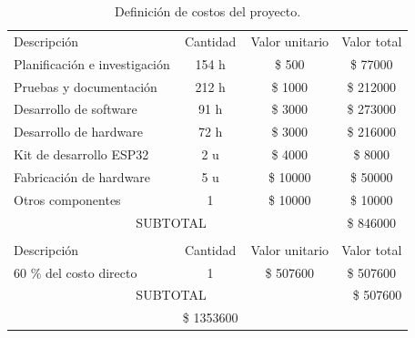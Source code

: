 \documentclass[
11pt, %
]{charter}
\begin{document}
\begin{table}[htpb]
\begin{tabularx}{\linewidth}{@{}|X|c|r|r|@{}}
\hline
\rowcolor[HTML]{C0C0C0} 
\hline
\multicolumn{4}{|c|}{\cellcolor[HTML]{C0C0C0}COSTOS DIRECTOS} \\ \hline
\rowcolor[HTML]{C0C0C0} \hline
Descripción &
  \multicolumn{1}{c|}{\cellcolor[HTML]{C0C0C0}Cantidad} &
  \multicolumn{1}{c|}{\cellcolor[HTML]{C0C0C0}Valor unitario} &
  \multicolumn{1}{c|}{\cellcolor[HTML]{C0C0C0}Valor total} \\ \hline
  
 Planificación e investigación & 
  \multicolumn{1}{c|}{154 h} & 
  \multicolumn{1}{c|}{\$ 500} &
  \multicolumn{1}{c|}{\$ 77000} \\ \hline
  
 Pruebas y documentación & 
  \multicolumn{1}{c|}{212 h} & 
  \multicolumn{1}{c|}{\$ 1000} &
  \multicolumn{1}{c|}{\$ 212000} \\ \hline
  
 Desarrollo de software & 
  \multicolumn{1}{c|}{91 h} & 
  \multicolumn{1}{c|}{\$ 3000} &
  \multicolumn{1}{c|}{\$ 273000} \\ \hline
  
 Desarrollo de hardware &
  \multicolumn{1}{c|}{72 h} &
  \multicolumn{1}{c|}{\$ 3000} &
  \multicolumn{1}{c|}{\$ 216000} \\ \hline
  
 Kit de desarrollo ESP32 &
  \multicolumn{1}{c|}{ 2 u} &
  \multicolumn{1}{c|}{ \$ 4000 } &
  \multicolumn{1}{c|}{\$ 8000} \\ \hline
  
 Fabricación de hardware &
  \multicolumn{1}{c|}{5 u} &
  \multicolumn{1}{c|}{\$ 10000} &
  \multicolumn{1}{c|}{\$ 50000} \\ \hline
  
 Otros componentes &
  \multicolumn{1}{c|}{ 1 } &
  \multicolumn{1}{c|}{\$ 10000} &
  \multicolumn{1}{c|}{\$ 10000}  \\ \hline
   
\multicolumn{3}{|c|}{SUBTOTAL} &
  \multicolumn{1}{c|}{\$ 846000} \\ \hline
  
\rowcolor[HTML]{C0C0C0} 
\multicolumn{4}{|c|}{\cellcolor[HTML]{C0C0C0}COSTOS INDIRECTOS} \\ \hline
\rowcolor[HTML]{C0C0C0} 
Descripción &
  \multicolumn{1}{c|}{\cellcolor[HTML]{C0C0C0}Cantidad} &
  \multicolumn{1}{c|}{\cellcolor[HTML]{C0C0C0}Valor unitario} &
  \multicolumn{1}{c|}{\cellcolor[HTML]{C0C0C0}Valor total} \\ \hline
  
 60 \% del costo directo &
  \multicolumn{1}{c|}{ 1 } &
  \multicolumn{1}{c|}{\$ 507600} &
  \multicolumn{1}{c|}{\$ 507600}  \\ \hline
\multicolumn{3}{|c|}{SUBTOTAL} & \$ 507600  \\ \hline
\rowcolor[HTML]{C0C0C0}
\multicolumn{3}{|c|}{TOTAL} & \$ 1353600   \\ \hline
\end{tabularx}
\caption{Definición de costos del proyecto.}
\label{tab:costos}
\end{table}
\end{document}
